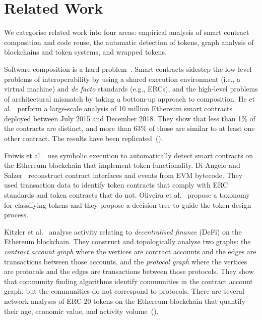 \section{Related Work}\label{sec:related-work}

We categorise related work into four areas: empirical analysis of
smart contract composition and code reuse, the automatic detection of
tokens, graph analysis of blockchains and token systems, and wrapped
tokens.

Software composition is a hard problem~\cite{garlan-et-al-94}.  Smart
contracts sidestep the low-level problems of interoperability by using
a shared execution environment (i.e., a virtual machine) and
\textit{de facto} standards (e.g., ERCs), and the high-level problems
of architectural mismatch by taking a bottom-up approach to
composition.  He et al.~\cite{he-et-al-20} perform a large-scale
analysis of \num{10} million Ethereum smart contracts deployed between
July 2015 and December 2018.  They show that less than \num{1}\% of
the contracts are distinct, and more than \num{63}\% of those are
similar to at least one other contract.  The results have been
replicated~(\hspace{1sp}\cite{kondo-et-al-20,chen-et-al-21,khan-et-al-22}).

Fr\"owis et al.~\cite{frowis-et-al-19} use symbolic execution to
automatically detect smart contracts on the Ethereum blockchain that
implement token functionality.  Di Angelo and
Salzer~\cite{di-angelo-salzer-21} reconstruct contract interfaces and
events from EVM bytecode.  They used transaction data to identify
token contracts that comply with ERC standards and token contracts
that do not.  Oliveira et al.~\cite{oliveira-et-al-18} propose a
taxonomy for classifying tokens and they propose a decision tree to
guide the token design process.

Kitzler et al.~\cite{kitzler-et-al-21} analyse activity relating to
\textit{decentralised finance} (DeFi) on the Ethereum blockchain.
They construct and topologically analyse two graphs: the
\textit{contract account graph} where the vertices are contract
accounts and the edges are transactions between those accounts, and
the \textit{protocol graph} where the vertices are protocols and the
edges are transactions between those protocols.  They show that
community finding algorithms identify communities in the contract
account graph, but the communities do not correspond to protocols.
There are several network analyses of ERC-20 tokens on the Ethereum
blockchain that quantify their age, economic value, and activity
volume~(\hspace{1sp}\cite{somin-et-al-18,victor-luders-19}).

